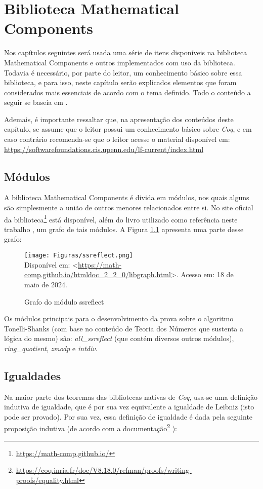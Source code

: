 \chapter{Biblioteca Mathematical Components}
\label{cap:mathcomp}

Nos capítulos seguintes será usada uma série de itens disponíveis na biblioteca Mathematical Components e outros implementados com uso da biblioteca. Todavia é necessário, por parte do leitor, um conhecimento básico sobre essa biblioteca, e para isso, neste capítulo serão explicados elementos que foram considerados mais essenciais de acordo com o tema definido. Todo o conteúdo a seguir se baseia em \cite{assia_mahboubi_2022_7118596}.

Ademais, é importante ressaltar que, na apresentação dos conteúdos deste capítulo, se assume que o leitor possui um conhecimento básico sobre \textit{Coq}, e em caso contrário recomenda-se que o leitor acesse o material disponível em: \url{https://softwarefoundations.cis.upenn.edu/lf-current/index.html}

\section{Módulos}
A biblioteca Mathematical Components é divida em módulos, nos quais alguns são simplesmente a união de outros menores relacionados entre si. No site oficial da biblioteca\footnote{\url{https://math-comp.github.io/}} está disponível, além do livro utilizado como referência neste trabalho \cite{assia_mahboubi_2022_7118596}, um grafo
de tais módulos. A Figura \ref{fig:graph-mathcomp} apresenta uma parte desse grafo:

\begin{figure}[h]
    \centering
    \caption{Grafo do módulo ssreflect}
    \texttt{[image: Figuras/ssreflect.png]}\\
    \footnotesize{Disponível em: <\url{https://math-comp.github.io/htmldoc_2_2_0/libgraph.html}>.
    Acesso em: 18 de maio de 2024.}
    \label{fig:graph-mathcomp}
\end{figure}

Os módulos principais para o desenvolvimento da prova sobre o algoritmo Tonelli-Shanks (com base no conteúdo de Teoria dos Números que sustenta a lógica do mesmo) são: \textit{all\_ssreflect} (que contém diversos outros módulos), \textit{ring\_quotient}, \textit{zmodp} e \textit{intdiv}.

\section{Igualdades}
Na maior parte dos teoremas das bibliotecas nativas de \textit{Coq}, usa-se uma definição indutiva de igualdade, que é por sua vez equivalente a igualdade de Leibniz (isto pode ser provado). Por sua vez, essa definição de igualdade é dada pela seguinte proposição indutiva (de acordo com a documentação\footnote{\url{https://coq.inria.fr/doc/V8.18.0/refman/proofs/writing-proofs/equality.html}} \cite{coqteam2022manual}):

